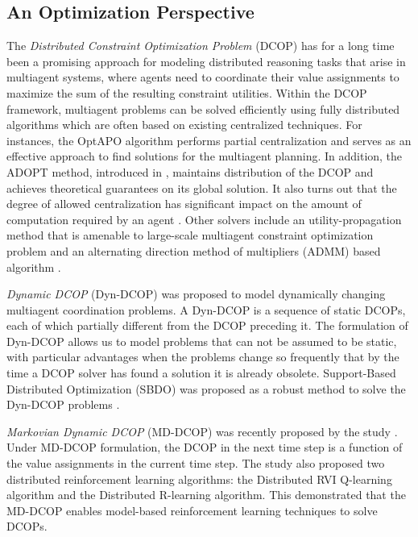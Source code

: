 \documentclass[conference]{IEEEtran}
\begin{document}
\subsection{An Optimization Perspective}
The \textit{Distributed Constraint Optimization Problem} (DCOP) has for a long
time been a promising approach for modeling distributed reasoning tasks
that arise in multiagent systems, where agents need to coordinate their value
assignments to maximize the sum of the resulting constraint utilities.
Within the DCOP framework, multiagent problems can be solved efficiently
using fully distributed algorithms which are often based on existing
centralized techniques.  For instances, the OptAPO algorithm
\cite{mailler2004solving} performs partial centralization and serves as an
effective approach to find solutions for the multiagent planning.
In addition, the ADOPT method, introduced in \cite{modi2005adopt}, maintains
distribution of the DCOP and achieves theoretical guarantees on its global
solution.
It also turns out that the degree of allowed centralization has significant impact
on the amount of computation required by an agent \cite{davin2005impact}. 
Other solvers include an utility-propagation method that is amenable to
large-scale multiagent constraint optimization problem
\cite{petcu2005scalable} and an alternating direction method of multipliers
(ADMM) based algorithm \cite{boyd2011distributed}.

\textit{Dynamic DCOP} (Dyn-DCOP) was
proposed to model dynamically changing multiagent coordination problems.
A Dyn-DCOP is a sequence of static DCOPs, each of which partially different
from the DCOP preceding it.
The formulation of Dyn-DCOP allows us to model problems that
can not be assumed to be static, with particular advantages when the problems
change so frequently that by the time a DCOP solver has found a solution it is
already obsolete. 
Support-Based Distributed Optimization (SBDO) was proposed as a robust method
to solve the Dyn-DCOP problems \cite{billiau2012sbdo}.

\textit{Markovian Dynamic DCOP} (MD-DCOP) was recently proposed by the study
 \cite{nguyen2014decentralized}. Under MD-DCOP formulation, the DCOP in the
next time step is a function of the value assignments in the current time
step. The study also proposed two distributed
reinforcement learning algorithms: the Distributed RVI Q-learning algorithm
and the Distributed R-learning algorithm. This demonstrated that the MD-DCOP
enables model-based reinforcement learning techniques to solve DCOPs.
\end{document}
